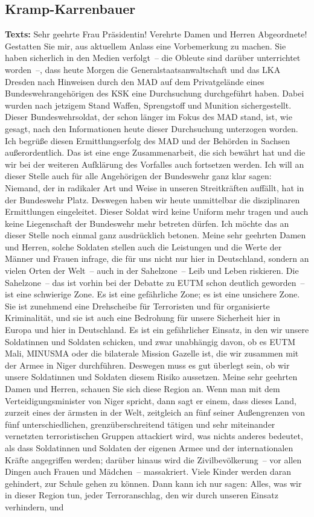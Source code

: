 \documentclass{article}
\begin{document}
\subsection{Kramp-Karrenbauer}
\noindent\textbf{Texts:} Sehr geehrte Frau Präsidentin! Verehrte Damen und Herren Abgeordnete! Gestatten Sie mir, aus aktuellem Anlass eine Vorbemerkung zu machen. Sie haben sicherlich in den Medien verfolgt – die Obleute sind darüber unterrichtet worden –, dass heute Morgen die Generalstaatsanwaltschaft und das LKA Dresden nach Hinweisen durch den MAD auf dem Privatgelände eines Bundeswehrangehörigen des KSK eine Durchsuchung durchgeführt haben. Dabei wurden nach jetzigem Stand Waffen, Sprengstoff und Munition sichergestellt. Dieser Bundeswehrsoldat, der schon länger im Fokus des MAD stand, ist, wie gesagt, nach den Informationen heute dieser Durchsuchung unterzogen worden. Ich begrüße diesen Ermittlungserfolg des MAD und der Behörden in Sachsen außerordentlich. Das ist eine enge Zusammenarbeit, die sich bewährt hat und die wir bei der weiteren Aufklärung des Vorfalles auch fortsetzen werden. Ich will an dieser Stelle auch für alle Angehörigen der Bundeswehr ganz klar sagen: Niemand, der in radikaler Art und Weise in unseren Streitkräften auffällt, hat in der Bundeswehr Platz.  Deswegen haben wir heute unmittelbar die disziplinaren Ermittlungen eingeleitet. Dieser Soldat wird keine Uniform mehr tragen und auch keine Liegenschaft der Bundeswehr mehr betreten dürfen. Ich möchte das an dieser Stelle noch einmal ganz ausdrücklich betonen.  Meine sehr geehrten Damen und Herren, solche Soldaten stellen auch die Leistungen und die Werte der Männer und Frauen infrage, die für uns nicht nur hier in Deutschland, sondern an vielen Orten der Welt – auch in der Sahelzone – Leib und Leben riskieren. Die Sahelzone – das ist vorhin bei der Debatte zu EUTM schon deutlich geworden – ist eine schwierige Zone. Es ist eine gefährliche Zone; es ist eine unsichere Zone. Sie ist zunehmend eine Drehscheibe für Terroristen und für organisierte Kriminalität, und sie ist auch eine Bedrohung für unsere Sicherheit hier in Europa und hier in Deutschland. Es ist ein gefährlicher Einsatz, in den wir unsere Soldatinnen und Soldaten schicken, und zwar unabhängig davon, ob es EUTM Mali, MINUSMA oder die bilaterale Mission Gazelle ist, die wir zusammen mit der Armee in Niger durchführen. Deswegen muss es gut überlegt sein, ob wir unsere Soldatinnen und Soldaten diesem Risiko aussetzen. Meine sehr geehrten Damen und Herren, schauen Sie sich diese Region an. Wenn man mit dem Verteidigungsminister von Niger spricht, dann sagt er einem, dass dieses Land, zurzeit eines der ärmsten in der Welt, zeitgleich an fünf seiner Außengrenzen von fünf unterschiedlichen, grenzüberschreitend tätigen und sehr miteinander vernetzten terroristischen Gruppen attackiert wird, was nichts anderes bedeutet, als dass Soldatinnen und Soldaten der eigenen Armee und der internationalen Kräfte angegriffen werden; darüber hinaus wird die Zivilbevölkerung – vor allen Dingen auch Frauen und Mädchen – massakriert. Viele Kinder werden daran gehindert, zur Schule gehen zu können. Dann kann ich nur sagen: Alles, was wir in dieser Region tun, jeder Terroranschlag, den wir durch unseren Einsatz verhindern, und 
\end{document}
